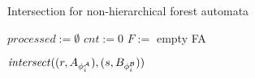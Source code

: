 \begin{algorithm}[ht]
  \caption{Intersection for non-hierarchical forest automata}
\label{alg:isect}

  $\mathit{processed} := \emptyset$\;
  $\mathit{cnt} := 0$\;
  $\mathit{F} :=$ empty FA\;
  
  {
	{
		{
			$\mathit{intersect}((r,A_{\phi_{i}^{\mathcal{A}}}),(s,B_{\phi_{i}^{\mathcal{B}}}))$\;
		}
	}
  }

  \;
\end{algorithm}



